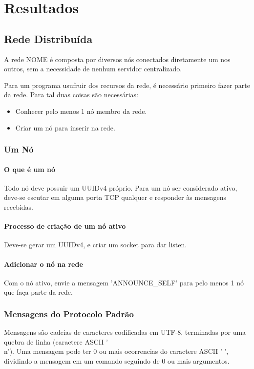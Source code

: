 \chapter{Resultados}
\label{sec:resultados}

\section{Rede Distribuída}
\label{sec:resultados:rede}

  A rede NOME é composta por diversos nós conectados diretamente um nos outros, sem a necessidade de nenhum servidor centralizado.
  
  Para um programa usufruir dos recursos da rede, é necessário primeiro fazer parte da rede. Para tal duas coisas são necessárias:
  \begin{itemize}
    \item Conhecer pelo menos 1 nó membro da rede.
    \item Criar um nó para inserir na rede.
  \end{itemize}
  
  \subsection{Um Nó}
    \subsubsection{O que é um nó}
      Todo nó deve possuir um UUIDv4 próprio.
      Para um nó ser considerado ativo, deve-se escutar em alguma porta TCP qualquer e responder às mensagens recebidas.
      
    \subsubsection{Processo de criação de um nó ativo}
      Deve-se gerar um UUIDv4, e criar um socket para dar listen.

    \subsubsection{Adicionar o nó na rede}
      Com o nó ativo, envie a mensagem 'ANNOUNCE\_SELF' para pelo menos 1 nó que faça parte da rede.

  \subsection{Mensagens do Protocolo Padrão}
    Mensagens são cadeias de caracteres codificadas em UTF-8, terminadas por uma quebra de linha
    (caractere ASCII '\\n'). Uma mensagem pode ter 0 ou mais ocorrencias do caractere ASCII ' ',
    dividindo a mensagem em um comando seguindo de 0 ou mais argumentos.
    
